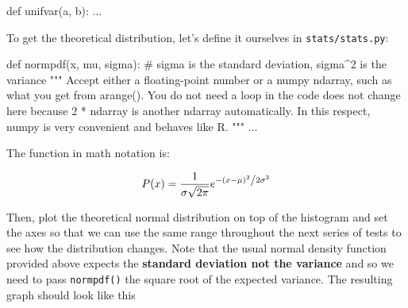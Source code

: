 \begin{fullwidth}
\begin{pyverbatim}
def unifvar(a, b):
    ...
\end{pyverbatim}

\step  To get the theoretical distribution, let's define it ourselves in {\tt stats/stats.py}:

\begin{pyverbatim}
def normpdf(x, mu, sigma): # sigma is the standard deviation, sigma^2 is the variance
    """
    Accept either a floating-point number or a numpy ndarray, such as what you get
    from arange().  You do not need a loop in the code does not change here
    because 2 * ndarray is another ndarray automatically. In this respect,
    numpy is very convenient and behaves like R.
    """
    ...
\end{pyverbatim}

\noindent The function in math notation is:

\[
P(x) = \frac{1}{{\sigma \sqrt {2\pi } }}e^{{{ - \left( {x - \mu } \right)^2 } \mathord{\left/ {\vphantom {{ - \left( {x - \mu } \right)^2 } {2\sigma ^2 }}} \right. \kern-\nulldelimiterspace} {2\sigma ^2 }}}
\]

\step Then, plot the theoretical normal distribution on top of the histogram and set the axes so that we can use the same range throughout the next series of tests to see how the distribution changes. Note that the usual normal density function provided above expects the {\bf standard deviation not the variance} and so we need to pass {\tt normpdf()} the square root of the expected variance. The resulting graph should look like this \\



\end{fullwidth}
